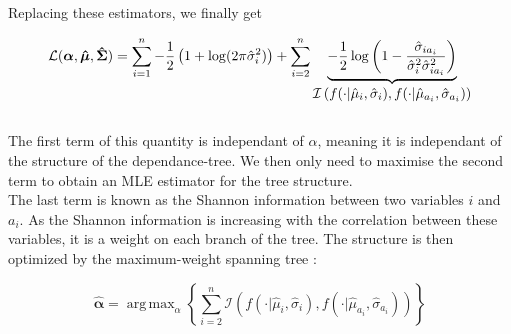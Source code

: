 \documentclass[a4paper,10pt]{article}
\DeclareMathOperator*{\argmax}{arg\,max}
\begin{document}
Replacing these estimators, we finally get

\[ \mathcal{L}(\bm{\alpha},\bm{\hat{\mu}},\bm{\hat{\Sigma}}) = \sum\limits_{i=1}^n -\frac{1}{2} \left(1+\log(2\pi\hat{\sigma}_i^2)\right) + 
\sum\limits_{i=2}^n \underbrace{- \frac{1}{2} \log \left( 1- \frac{\hat{\sigma}_{ia_i}}{\hat{\sigma}_i^2 \hat{\sigma}_{ia_i}^2}\right)}_{\text{\normalsize{$\mathcal{I}\left(f
(\cdot|\hat{\mu}_i,\hat{\sigma}_i),f(\cdot|\hat{\mu}_{a_i},\hat{\sigma}_{a_i})\right)$}}}\]\\

The first term of this quantity is independant of $\alpha$, meaning it is independant of the structure of the dependance-tree. We then only need to maximise
the second term to obtain an MLE estimator for the tree structure.\\

The last term is known as the Shannon information between two variables $i$ and $a_i$. As the Shannon information is increasing with 
the correlation between these variables, it is a weight on each branch of the tree. The structure is then optimized by the maximum-weight spanning tree :

\[ \hat{\bm{\alpha}} = \argmax_\alpha \left\{ \sum\limits_{i=2}^n \mathcal{I}\left(f(\cdot|\hat{\mu}_i,\hat{\sigma}_i),
f(\cdot|\hat{\mu}_{a_i},\hat{\sigma}_{a_i})\right) \right\} \]
\end{document}
